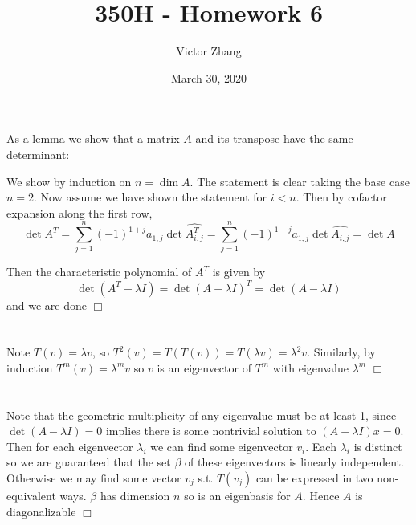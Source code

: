 \documentclass{article}
\title{350H - Homework 6}
\author{Victor Zhang}
\date{March 30, 2020}
\newenvironment{myindentpar}[1]
  {\begin{list}{}
          {\setlength{\leftmargin}{#1}}
          \item[]
  }
  {\end{list}}
\begin{document}
\maketitle

\section{}
As a lemma we show that a matrix $A$ and its transpose have the same determinant:
\begin{myindentpar}{2em}
    We show by induction on $n = \dim A$. The statement is clear taking the base case $n=2$. Now assume we have shown the statement for $i < n$. Then by cofactor expansion along the first row,
    $$\det A^T = \sum\limits_{j=1}^n (-1)^{1+j} a_{1,j} \det \widehat{A^T_{i,j}} = \sum\limits_{j=1}^n (-1)^{1+j} a_{1,j} \det \widehat{A_{i,j}} = \det A$$
\end{myindentpar}
Then the characteristic polynomial of $A^T$ is given by
$$\det(A^T - \lambda I) = \det (A-\lambda I)^T = \det (A-\lambda I)$$
and we are done $\Box$

\section{}
Note $T(v) = \lambda v$, so $T^2(v) = T(T(v)) = T(\lambda v) = \lambda^2 v$. Similarly, by induction $T^m(v) = \lambda^m v$ so $v$ is an eigenvector of $T^m$ with eigenvalue $\lambda^m$ $\Box$

\section{}
Note that the geometric multiplicity of any eigenvalue must be at least 1, since $\det (A-\lambda I) = 0$ implies there is some nontrivial solution to $(A-\lambda I)x = 0$. Then for each eigenvector $\lambda_i$ we can find some eigenvector $v_i$. Each $\lambda_i$ is distinct so we are guaranteed that the set $\beta$ of these eigenvectors is linearly independent. Otherwise we may find some vector $v_j$ s.t. $T(v_j)$ can be expressed in two non-equivalent ways. $\beta$ has dimension $n$ so is an eigenbasis for $A$. Hence $A$ is diagonalizable $\Box$
\end{document}
